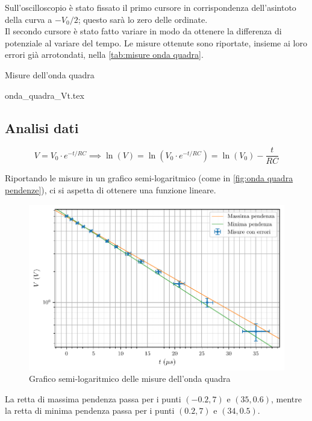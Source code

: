 \documentclass[11pt, a4paper]{article}
\numberwithin{equation}{section} %
\begin{document}
Sull'oscilloscopio è stato fissato il primo cursore in corrispondenza dell'asintoto della curva a \(- V_{0}/2\); questo sarà lo zero delle ordinate. \\
Il secondo cursore è stato fatto variare in modo da ottenere la differenza di potenziale al variare del tempo. Le misure ottenute sono riportate, insieme ai loro errori già arrotondati, nella \autoref{tab:misure onda quadra}.

\begin{table}[ht!]
    \centering
    \caption{Misure dell'onda quadra}
    {onda_quadra_Vt.tex}
    \label{tab:misure onda quadra}
\end{table}

\subsection{Analisi dati}

\begin{equation*}
    V = V_{0} \cdot e^{-t/RC} \implies \ln(V) = \ln(V_{0} \cdot e^{-t/RC}) = \ln(V_{0}) - \frac{t}{RC}
\end{equation*}

Riportando le misure in un grafico semi-logaritmico (come in \autoref{fig:onda quadra pendenze}), ci si aspetta di ottenere una funzione lineare.

\begin{figure}[ht!]
    \includegraphics{onda_quadra_V(t)_pendenze.pdf}
    \caption{Grafico semi-logaritmico delle misure dell'onda quadra}
    \label{fig:onda quadra pendenze}
\end{figure}

La retta di massima pendenza passa per i punti \((-0.2, 7)\) e \((35, 0.6)\), mentre la retta di minima pendenza passa per i punti \((0.2, 7)\) e \((34, 0.5)\).
\end{document}
